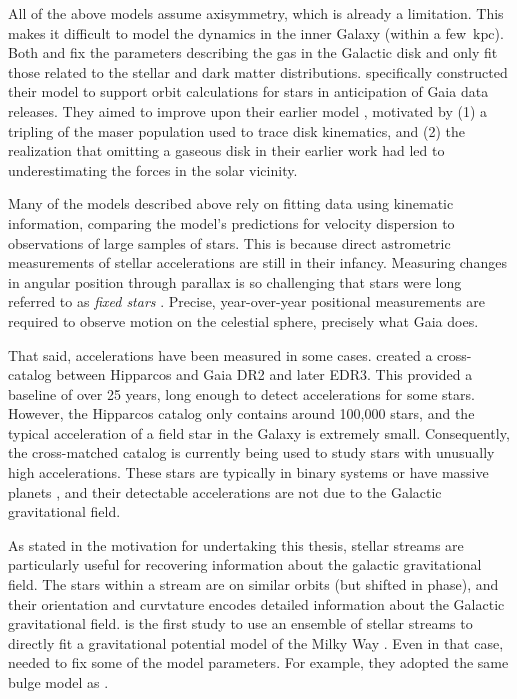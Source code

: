         All of the above models assume axisymmetry, which is already a limitation. This makes it difficult to model the dynamics in the inner Galaxy (within a few~$\mathrm{kpc}$). Both \citet{2017MNRAS.465...76M} and \citet{2024MNRAS.527.1915B} fix the parameters describing the gas in the Galactic disk and only fit those related to the stellar and dark matter distributions. \citet{2017MNRAS.465...76M} specifically constructed their model to support orbit calculations for stars in anticipation of Gaia data releases. They aimed to improve upon their earlier model \citep{2011MNRAS.414.2446M}, motivated by (1) a tripling of the maser population used to trace disk kinematics, and (2) the realization that omitting a gaseous disk in their earlier work had led to underestimating the forces in the solar vicinity.

        Many of the models described above rely on fitting data using kinematic information, comparing the model's predictions for velocity dispersion to observations of large samples of stars. This is because direct astrometric measurements of stellar accelerations are still in their infancy. Measuring changes in angular position through parallax is so challenging that stars were long referred to as \textit{fixed stars} \citep{1981unht.book.....K}. Precise, year-over-year positional measurements are required to observe motion on the celestial sphere, precisely what Gaia does.

        That said, accelerations have been measured in some cases. \citet{2018ApJS..239...31B,2021ApJS..254...42B} created a cross-catalog between Hipparcos and Gaia DR2 \citep{2018A&A...616A...1G} and later EDR3. This provided a baseline of over 25 years, long enough to detect accelerations for some stars. However, the Hipparcos catalog only contains around 100,000 stars, and the typical acceleration of a field star in the Galaxy is extremely small. Consequently, the cross-matched catalog is currently being used to study stars with unusually high accelerations. These stars are typically in binary systems or have massive planets \citep{2023MNRAS.521.5232W,2025AJ....170...52G}, and their detectable accelerations are not due to the Galactic gravitational field.

        As stated in the motivation for undertaking this thesis, stellar streams are particularly useful for recovering information about the galactic gravitational field. The stars within a stream are on similar orbits (but shifted in phase), and their orientation and curvtature encodes detailed information about the Galactic gravitational field. \citet{2024ApJ...967...89I} is the first study to use an ensemble of stellar streams to directly fit a gravitational potential model of the Milky Way \citep[see also][]{2010AAS...21532103L,2016ApJ...833...31B}. Even in that case, \citet{2024ApJ...967...89I} needed to fix some of the model parameters. For example, they adopted the same bulge model as \citet{2017MNRAS.465...76M}.

